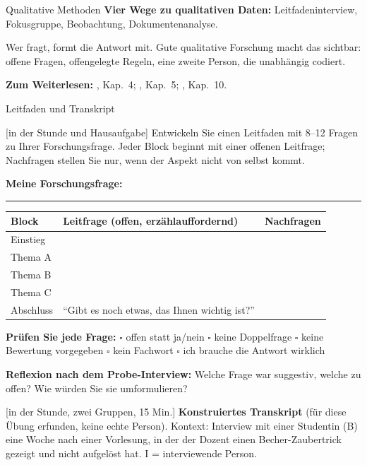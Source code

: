 \begin{handout}{Qualitative Methoden}
\textbf{Vier Wege zu qualitativen Daten:} Leitfadeninterview,
Fokusgruppe, Beobachtung, Dokumentenanalyse.

\begin{merkbox}
Wer fragt, formt die Antwort mit. Gute qualitative Forschung macht das
sichtbar: offene Fragen, offengelegte Regeln, eine zweite Person, die
unabhängig codiert.
\end{merkbox}

\textbf{Zum Weiterlesen:} \textcite{helfferich2011qualitaet}, Kap.~4;
\textcite{mayring2015inhaltsanalyse}, Kap.~5; \textcite{doeringbortz2016},
Kap.~10.
\end{handout}

\begin{uebungsblatt}{Leitfaden und Transkript}

[in der Stunde und Hausaufgabe]
Entwickeln Sie einen Leitfaden mit 8--12 Fragen zu Ihrer Forschungsfrage.
Jeder Block beginnt mit einer offenen Leitfrage; Nachfragen stellen Sie
nur, wenn der Aspekt nicht von selbst kommt.

\textbf{Meine Forschungsfrage:} \rule{0.72\textwidth}{0.3pt}

\begin{center}
\small
\renewcommand{\arraystretch}{2.4}
\begin{tabular}{|p{}|p{}|p{}|}
\hline
\textbf{Block} & \textbf{Leitfrage (offen, erzählauffordernd)} & \textbf{Nachfragen} \\
\hline
Einstieg & & \\ \hline
Thema A & & \\ \hline
Thema B & & \\ \hline
Thema C & & \\ \hline
Abschluss & \enquote{Gibt es noch etwas, das Ihnen wichtig ist?} & \\ \hline
\end{tabular}
\end{center}

\textbf{Prüfen Sie jede Frage:} \quad $\square$ offen statt ja/nein \quad
$\square$ keine Doppelfrage \quad $\square$ keine Bewertung vorgegeben
\quad $\square$ kein Fachwort \quad $\square$ ich brauche die Antwort
wirklich

\textbf{Reflexion nach dem Probe-Interview:} Welche Frage war suggestiv,
welche zu offen? Wie würden Sie sie umformulieren?

[in der Stunde, zwei Gruppen, 15 Min.]
\textbf{Konstruiertes Transkript} (für diese Übung erfunden, keine echte
Person). Kontext: Interview mit einer Studentin (B) eine Woche nach einer
Vorlesung, in der der Dozent einen Becher-Zaubertrick gezeigt und nicht
aufgelöst hat. I = interviewende Person.


\end{uebungsblatt}
